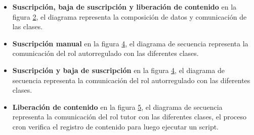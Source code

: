 \begin{itemize}
\begin{figure}[H]
	\centering
	\label{fig:Diagrama de clase para suscripción de usuario}
\end{figure}

\item \textbf{Suscripción, baja de suscripción y liberación de contenido}
en la figura \ref{fig:Diagrama de clase para suscriptor}, el diagrama
representa la composición de datos y comunicación de las clases.

\begin{figure}[!ht]
	\centering
	\label{fig:Diagrama de clase para suscriptor}
\end{figure}

\item \textbf{Suscripción manual}
en la figura \ref{fig:Diagrama de secuencia para suscripción}, el diagrama
de secuencia representa la comunicación del rol autorregulado con las
diferentes clases.

\begin{figure}[H]
	\centering
	\label{fig:Diagrama de secuencia para suscripción}
\end{figure}

\item \textbf{Suscripción y baja de suscripción}
en la figura \ref{fig:Diagrama de secuencia para suscripción}, el diagrama
de secuencia representa la comunicación del rol autorregulado con las
diferentes clases.

\begin{figure}[!ht]
	\centering
	\label{fig:Diagrama de secuencia para suscripción}
\end{figure}


\item \textbf{Liberación de contenido}
en la figura \ref{fig:Diagrama de secuencia para liberación de contenido},
el diagrama de secuencia representa la comunicación del rol tutor con las
diferentes clases, el proceso cron verifica el registro de contenido para
luego ejecutar un script.

\begin{figure}[!ht]
	\centering
	\label{fig:Diagrama de secuencia para liberación de contenido}
\end{figure}

\end{itemize}


